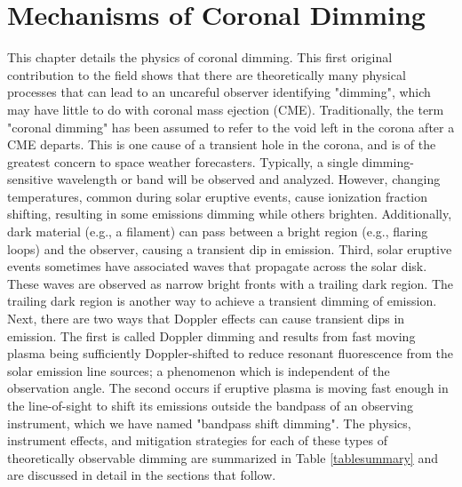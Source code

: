 \chapter{Mechanisms of Coronal Dimming}
\label{chaptermechanisms}



This chapter details the physics of coronal dimming. This first original contribution to the field shows that there are theoretically many physical processes that can lead to an uncareful observer identifying "dimming", which may have little to do with coronal mass ejection (CME). Traditionally, the term "coronal dimming" has been assumed to refer to the void left in the corona after a CME departs. This is one cause of a transient hole in the corona, and is of the greatest concern to space weather forecasters. Typically, a single dimming-sensitive wavelength or band will be observed and analyzed. However, changing temperatures, common during solar eruptive events, cause ionization fraction shifting, resulting in some emissions dimming while others brighten. Additionally, dark material (e.g., a filament) can pass between a bright region (e.g., flaring loops) and the observer, causing a transient dip in emission. Third, solar eruptive events sometimes have associated waves that propagate across the solar disk. These waves are observed as narrow bright fronts with a trailing dark region. The trailing dark region is another way to achieve a transient dimming of emission. Next, there are two ways that Doppler effects can cause transient dips in emission. The first is called Doppler dimming and results from fast moving plasma being sufficiently Doppler-shifted to reduce resonant fluorescence from the solar emission line sources; a phenomenon which is independent of the observation angle. The second occurs if eruptive plasma is moving fast enough in the line-of-sight to shift its emissions outside the bandpass of an observing instrument, which we have named "bandpass shift dimming". The physics, instrument effects, and mitigation strategies for each of these types of theoretically observable dimming are summarized in Table \ref{tablesummary} and are discussed in detail in the sections that follow. 

